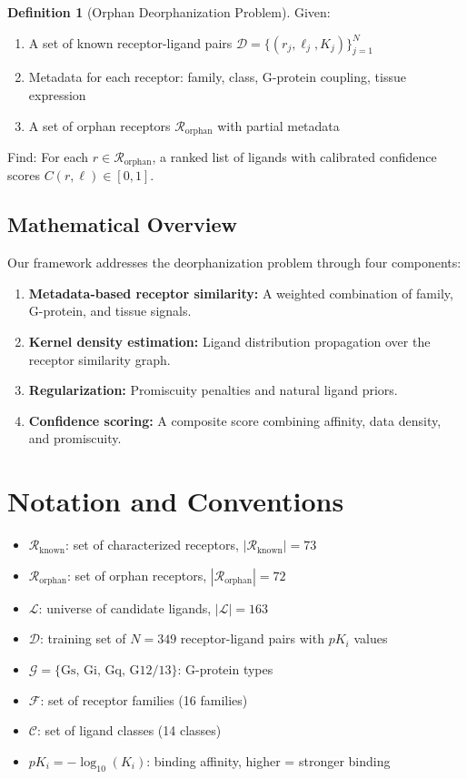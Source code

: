 \documentclass[12pt,oneside]{article}
\theoremstyle{definition}
\newtheorem{definition}{Definition}[section]
\newcommand{\RR}{\mathcal{R}}
\newcommand{\LL}{\mathcal{L}}
\begin{document}
\begin{definition}[Orphan Deorphanization Problem]
Given:
\begin{enumerate}[label=(\arabic*)]
\item A set of known receptor-ligand pairs $\mathcal{D} = \{(r_j, \ell_j, K_j)\}_{j=1}^{N}$
\item Metadata for each receptor: family, class, G-protein coupling, tissue expression
\item A set of orphan receptors $\RR_{\text{orphan}}$ with partial metadata
\end{enumerate}
Find: For each $r \in \RR_{\text{orphan}}$, a ranked list of ligands with calibrated confidence scores $C(r, \ell) \in [0, 1]$.
\end{definition}

\subsection{Mathematical Overview}

Our framework addresses the deorphanization problem through four components:

\begin{enumerate}[label=(\Roman*)]
\item \textbf{Metadata-based receptor similarity:} A weighted combination of family, G-protein, and tissue signals.
\item \textbf{Kernel density estimation:} Ligand distribution propagation over the receptor similarity graph.
\item \textbf{Regularization:} Promiscuity penalties and natural ligand priors.
\item \textbf{Confidence scoring:} A composite score combining affinity, data density, and promiscuity.
\end{enumerate}

\section{Notation and Conventions}

\begin{itemize}[label=\textbullet]
\item $\RR_{\text{known}}$: set of characterized receptors, $|\RR_{\text{known}}| = 73$
\item $\RR_{\text{orphan}}$: set of orphan receptors, $|\RR_{\text{orphan}}| = 72$
\item $\LL$: universe of candidate ligands, $|\LL| = 163$
\item $\mathcal{D}$: training set of $N = 349$ receptor-ligand pairs with $pK_i$ values
\item $\mathcal{G} = \{\text{Gs, Gi, Gq, G12/13}\}$: G-protein types
\item $\mathcal{F}$: set of receptor families (16 families)
\item $\mathcal{C}$: set of ligand classes (14 classes)
\item $pK_i = -\log_{10}(K_i)$: binding affinity, higher = stronger binding
\end{itemize}
\end{document}
